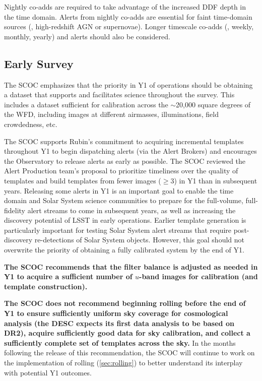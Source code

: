 Nightly co-adds are required to take advantage of the increased DDF depth in the time domain. Alerts from nightly co-adds are essential for faint time-domain sources (\eg , high-redshift AGN or supernovae). Longer timescale co-adds (\eg , weekly, monthly, yearly) and alerts should also be considered.





\FloatBarrier

\subsection{Early Survey}\label{sec:early}

 The SCOC emphasizes that the priority in Y1 of operations should be obtaining a dataset that supports and facilitates science throughout the survey. This includes a dataset sufficient for calibration across the \mbox{$\sim$20,000} square degrees of the WFD, including images at different airmasses, illuminations, field crowdedness, etc. 
 
 The SCOC supports Rubin's commitment to acquiring incremental templates throughout Y1 to begin dispatching alerts (via the Alert Brokers) and encourages the Observatory to release alerts as early as possible. The SCOC reviewed the Alert Production team's proposal to prioritize timeliness over the quality of templates and build templates from fewer images ($\geq 3$) in Y1 than in subsequent years. Releasing some alerts in Y1 is an important goal to enable the time domain and Solar System science communities to prepare for the full-volume, full-fidelity alert streams to come in subsequent years, as well as increasing the discovery potential of LSST in early operations. Earlier template generation is particularly important for testing Solar System alert streams that require post-discovery re-detections of Solar System objects.
 However, this goal should not overwrite the priority of obtaining a fully calibrated system by the end of Y1.

 {\bf The SCOC recommends that the filter balance is adjusted as needed in Y1 to acquire a sufficient number of $u$-band images for calibration (and template construction). }

 {\bf The SCOC does not recommend beginning rolling before the end of Y1 to ensure sufficiently uniform sky coverage for cosmological analysis (the DESC expects its first data analysis to be based on DR2), acquire sufficiently good data for sky calibration, and collect a 
 sufficiently complete set of templates across the sky.} In the months following the release of this recommendation, the SCOC will continue to work on the implementation of rolling (\autoref{sec:rolling}) to better understand its interplay with potential Y1 outcomes. 

